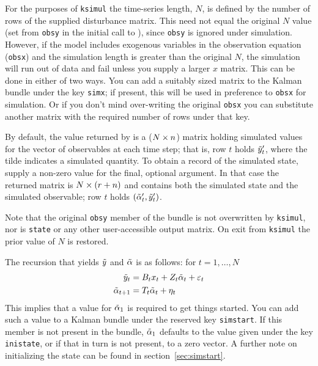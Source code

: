For the purposes of \texttt{ksimul} the time-series length, $N$, is
defined by the number of rows of the supplied disturbance matrix. This
need not equal the original $N$ value (set from \texttt{obsy} in the
initial call to ), since \texttt{obsy} is ignored under
simulation. However, if the model includes exogenous variables in the
observation equation (\texttt{obsx}) and the simulation length is
greater than the original $N$, the simulation will run out of data and
fail unless you supply a larger $x$ matrix.  This can be done in
either of two ways. You can add a suitably sized matrix to the Kalman
bundle under the key \texttt{simx}; if present, this will be used in
preference to \texttt{obsx} for simulation. Or if you don't mind
over-writing the original \texttt{obsx} you can substitute another
matrix with the required number of rows under that key.

By default, the value returned by  is a
($N \times n$) matrix holding simulated values for the vector of
observables at each time step; that is, row $t$ holds
$\tilde{y}_t'$, where the tilde indicates a simulated quantity.
To obtain a record of the simulated state, supply a non-zero value for
the final, optional argument. In that case the returned matrix is
$N \times (r + n)$ and contains both the simulated state
and the simulated observable; row $t$ holds
$(\tilde{\alpha}_t', \tilde{y}_t')$.

Note that the original \texttt{obsy} member of the bundle is not
overwritten by \texttt{ksimul}, nor is \texttt{state} or any other
user-accessible output matrix. On exit from \texttt{ksimul} the prior
value of $N$ is restored.

The recursion that yields $\tilde{y}$ and $\tilde{\alpha}$
is as follows: for $t=1,\dots,N$
%
\begin{align*}
  \tilde{y}_t &= B_tx_t +
   Z_t \tilde{\alpha}_t + \varepsilon_t  \\
  \tilde{\alpha}_{t+1} &= T_t \tilde{\alpha}_t + \eta_t
\end{align*}
%
This implies that a value for $\tilde{\alpha}_1$ is required to get
things started. You can add such a value to a Kalman bundle under the
reserved key \texttt{simstart}. If this member is not present in the
bundle, $\tilde{\alpha}_1$ defaults to the value given under the
key \texttt{inistate}, or if that in turn is not present, to a zero
vector. A further note on initializing the state can be found in
section~\ref{sec:simstart}.

